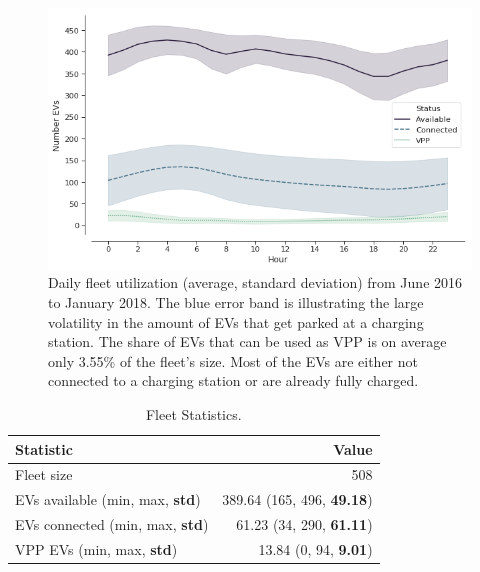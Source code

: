 \documentclass[a4paper, 12pt]{article}
\begin{document}
\begin{figure}[h]
\centering
\includegraphics[width=1\linewidth]{fig/fleet-utilization.png}
\caption[Fleet Utilzation]{Daily fleet utilization (average, standard deviation) from June 2016 to January 2018. The blue error band is illustrating the large volatility in the amount of EVs that get parked at a charging station. The share of EVs that can be used as VPP is on average only 3.55\% of the fleet's size. Most of the EVs are either not connected to a charging station or are already fully charged. \label{fig-fleet-utilization}}
\end{figure}

\begin{table}[hp]
\caption[Fleet Statistics]{Fleet Statistics. \label{table-sim-stats}}
\centering
\begin{tabular}{lr}
\hline
\hline
Statistic & Value\\
\hline
Fleet size & 508\\
EVs available (min, max, \textbf{std}) & 389.64 (165, 496, \textbf{49.18})\\
EVs connected (min, max, \textbf{std}) & 61.23 (34, 290, \textbf{61.11})\\
VPP EVs (min, max, \textbf{std}) & 13.84 (0, 94, \textbf{9.01})\\
\hline
\hline
\end{tabular}
\end{table}
\end{document}
